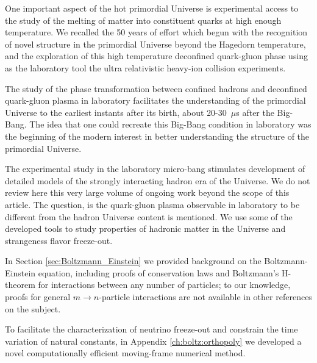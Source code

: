 One important aspect of the hot primordial Universe is experimental access to the study of the melting of matter into constituent quarks at high enough temperature. We recalled the 50 years of effort which begun with the recognition  of novel structure in the primordial Universe beyond the Hagedorn temperature, and the exploration of this high temperature deconfined quark-gluon phase using as the laboratory tool the ultra relativistic heavy-ion collision experiments. 

The study of the phase transformation between confined hadrons and deconfined quark-gluon plasma in laboratory facilitates the understanding of the primordial Universe to the earliest instants after its birth, about 20-30\, $\mu$s after the Big-Bang. The idea that one could recreate this Big-Bang condition in laboratory was the beginning of the modern interest in better understanding the structure of the primordial Universe. 

The experimental study in the laboratory micro-bang  stimulates development of detailed models of the strongly interacting hadron era of the Universe. We do not review here this very large volume of ongoing work beyond the scope of this article. The question, is the quark-gluon plasma observable in laboratory to be different from the hadron Universe content is mentioned. We use some of the developed tools to study properties of hadronic matter in the Universe and strangeness flavor freeze-out.



In Section \ref{sec:Boltzmann_Einstein} we provided background on the Boltzmann-Einstein equation, including proofs of conservation laws and Boltzmann's H-theorem for interactions between any number of particles; to our knowledge, proofs for general $m\to n$-particle interactions are not available in other references on the subject.

To facilitate the characterization of neutrino freeze-out and constrain the time variation of natural constants, in Appendix \ref{ch:boltz:orthopoly} we developed a novel computationally efficient moving-frame numerical method.


 